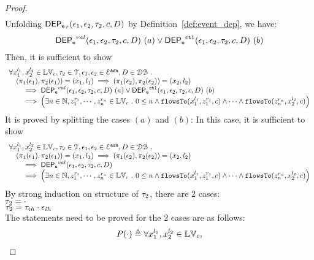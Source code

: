 \begin{proof}
\[\begin{array}{l}
\end{array}
\]
%
%
%
Unfolding $\eventdep_{\trace}(\event_1, \event_2, \trace_2, c, D)$ by Definition~\ref{def:event_dep}, we have:
\[
\mathsf{DEP_{\mathtt{e}}}^{val}(\mathtt{\epsilon}_1, \mathtt{\epsilon}_2, \mathtt{\tau}_2, c, D) ~ (a) 
\lor
\mathsf{DEP_{\mathtt{e}}}^{\mathtt{{ctl}}}(\mathtt{\epsilon}_1, \mathtt{\epsilon}_2, \mathtt{\tau}_2, c, D) ~ (b)
\]
%
Then, it is sufficient to show
%
\[
\begin{array}{l}
\forall {x}_1^{l_1}, {x}_2^{l_2} \in \mathbb{LV}_{{c}}, \mathtt{\tau}_2 \in \mathcal{T}, 
\mathtt{\epsilon}_1, \mathtt{\epsilon}_2 \in \mathcal{E}^{\mathtt{{asn}}}, D \in \mathcal{DB} ~.~
\\ \quad
(\pi_{1}{(\mathtt{\epsilon}_1)}, \pi_{2}{(\mathtt{\epsilon}_1)}) = ({x}_1, l_1)
\implies
(\pi_{1}{(\mathtt{\epsilon}_2)}, \pi_{2}{(\mathtt{\epsilon}_2)}) = ({x}_2, l_2)
 \\ \qquad \implies 
\mathsf{DEP_{\mathtt{e}}}^{val}(\mathtt{\epsilon}_1, \mathtt{\epsilon}_2, \mathtt{\tau}_2, c, D) ~ (a)
\lor
\mathsf{DEP_{\mathtt{e}}}^{\mathtt{{ctl}}}(\mathtt{\epsilon}_1, \mathtt{\epsilon}_2, \mathtt{\tau}_2, c, D)  ~ (b)
 \\ \qquad \implies
   \Big(\exists  n \in \mathbb{N}, z_1^{r_1}, \cdots, z_n^{r_n} \in \mathbb{LV}_{{c}} ~.~ 0 \leq n
 \land \mathtt{flowsTo}(x_1^{l_1}, z_1^{r_1}, c) \land \cdots \land \mathtt{flowsTo}(z_n^{r_n}, {x}_2^{l_2}, c) \Big)
\end{array}
\]
%
%
It is proved by splitting the cases $(a)$ and $(b)$:
%
%
In this case, it is sufficient to show
 \[
\begin{array}{l}
\forall {x}_1^{l_1}, {x}_2^{l_2} \in \mathbb{LV}_{{c}}, \mathtt{\tau}_2 \in \mathcal{T}, 
\mathtt{\epsilon}_1, \mathtt{\epsilon}_2 \in \mathcal{E}^{\mathtt{{asn}}}, D \in \mathcal{DB} ~.~
\\ \quad
(\pi_{1}{(\mathtt{\epsilon}_1)}, \pi_{2}{(\mathtt{\epsilon}_1)}) = ({x}_1, l_1)
\implies
(\pi_{1}{(\mathtt{\epsilon}_2)}, \pi_{2}{(\mathtt{\epsilon}_2)}) = ({x}_2, l_2)
 \\ \qquad \implies 
\mathsf{DEP_{\mathtt{e}}}^{val}(\mathtt{\epsilon}_1, \mathtt{\epsilon}_2, \mathtt{\tau}_2, c, D)
 \\ \qquad \implies
   \Big(\exists  n \in \mathbb{N}, z_1^{r_1}, \cdots, z_n^{r_n} \in \mathbb{LV}_{{c}} ~.~ 0 \leq n
 \land \mathtt{flowsTo}(x_1^{l_1}, z_1^{r_1}, c) \land \cdots \land \mathtt{flowsTo}(z_n^{r_n}, {x}_2^{l_2}, c) \Big)
\end{array}
\]
%
By strong induction on structure of $\vtrace_2$, there are 2 cases:
\\
$\trace_2 = \cdot$
\\
$\trace_2 = \trace_{ih} \cdot \event_{ih}$
%
\\
%
The statements need to be proved for the 2 cases are as follows:
%
$$
\begin{array}{l}
P(\cdot)
 \triangleq
\forall {x}_1^{l_1}, {x}_2^{l_2} \in \lvar_{{c}},

\end{array}$$
\end{proof}
